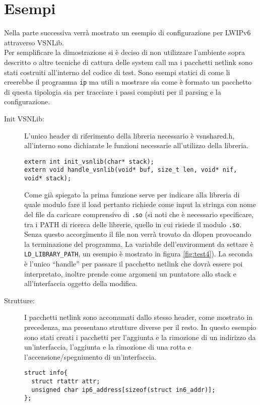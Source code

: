 \section{Esempi}                 %
Nella parte successiva verr\`a mostrato un esempio di configurazione per LWIPv6 attraverso VSNLib.\\
Per semplificare la dimostrazione si \`e deciso di non utilizzare l'ambiente sopra descritto o altre tecniche di cattura delle system call ma i pacchetti netlink sono stati costruiti all'interno del codice di test. Sono esempi statici di come li creerebbe il programma \texttt{ip} ma utili a mostrare sia come \`e formato un pacchetto di questa tipologia sia per tracciare i passi compiuti per il parsing e la configurazione.
\begin{description}
\item[Init VSNLib: ]L'unico header di riferimento della libreria necessario \`e vsnshared.h, all'interno sono dichiarate le funzioni necessarie all'utilizzo della libreria.
\begin{lstlisting}[style=CStyle]
extern int init_vsnlib(char* stack);
extern void handle_vsnlib(void* buf, size_t len, void* nif, void* stack);
\end{lstlisting}
Come gi\`a spiegato la prima funzione serve per indicare alla libreria di quale modulo fare il load pertanto richiede come input la stringa con nome del file da caricare comprensivo di \texttt{.so} (si noti che \`e necessario specificare, tra i PATH di ricerca delle librerie, quello in cui risiede il modulo \texttt{.so}. Senza questo accorgimento il file non verr\`a trovato da dlopen provocando la terminazione del programma. La variabile dell'environment da settare \`e \texttt{LD\_LIBRARY\_PATH}, un esempio \`e mostrato in figura \ref{fig:test4}).
La seconda \`e l'unico ``handle'' per passare il pacchetto netlink che dovr\`a essere poi interpretato, inoltre prende come argomeni un puntatore allo stack e all'interfaccia oggetto della modifica.
\item[Strutture: ]I pacchetti netlink sono accomunati dallo stesso header, come mostrato in precedenza, ma presentano strutture diverse per il resto. In questo esempio sono stati creati i pacchetti per l'aggiunta e la rimozione di un indirizzo da un'interfaccia, l'aggiunta e la rimozione di una rotta e l'accensione/spegnimento di un'interfaccia.
\begin{lstlisting}[style=CStyle]
struct info{
  struct rtattr attr;
  unsigned char ip6_address[sizeof(struct in6_addr)];
};


\end{lstlisting}
\end{description}
